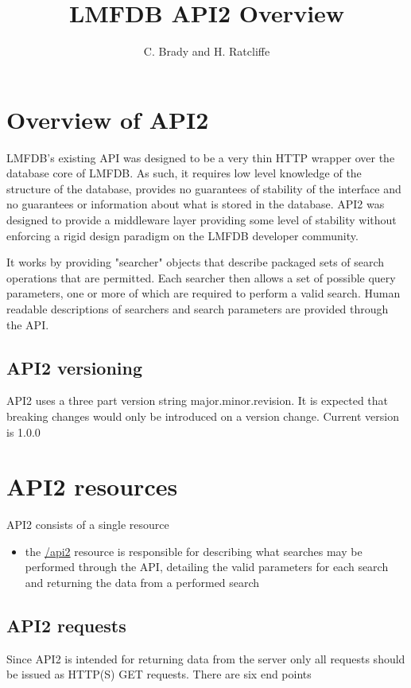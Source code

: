 \documentclass[11pt]{article}
\title{LMFDB API2 Overview}
\author{C. Brady and H. Ratcliffe}
\date{}                                           %
\begin{document}
\maketitle
\section{Overview of API2}
LMFDB's existing API was designed to be a very thin HTTP wrapper over the database core of LMFDB. As such, it requires low level knowledge of the structure of the database, provides no guarantees of stability of the interface and no guarantees or information about what is stored in the database. API2 was designed to provide a middleware layer providing some level of stability without enforcing a rigid design paradigm on the LMFDB developer community.

It works by providing "searcher" objects that describe packaged sets of search operations that are permitted. Each searcher then allows a set of possible query parameters, one or more of which are required to perform a valid search. Human readable descriptions of searchers and search parameters are provided through the API.

\subsection{API2 versioning}
API2 uses a three part version string major.minor.revision. It is expected that breaking changes would only be introduced on a version change. Current version is 1.0.0

\section{API2 resources}
API2 consists of a single resource

\begin{itemize}
\item the \url{/api2} resource is responsible for describing what searches may be performed through the API, detailing the valid parameters for each search and returning the data from a performed search
\end{itemize}

\subsection{API2 requests}
Since API2 is intended for returning data from the server only all requests should be issued as HTTP(S) GET requests. There are six end points
\end{document}
